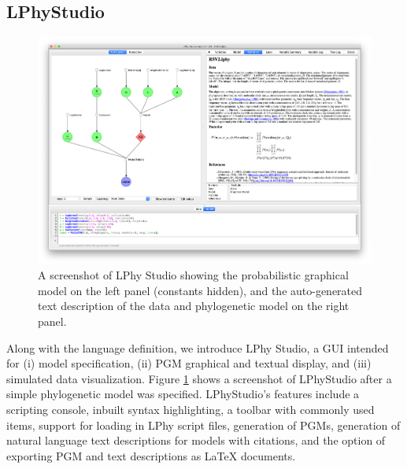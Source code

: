 \documentclass[10pt,letterpaper,table]{article}
\begin{document}

\subsection{LPhyStudio} 
\begin{figure}[!h]
  \includegraphics[width=\textwidth]{figs_plos/lphystudio_screenshot.png}
  \caption{A screenshot of LPhy Studio showing the probabilistic graphical model 
  on the left panel (constants hidden), and the auto-generated text description of the data and phylogenetic model on the right panel.} 
  \label{fig:lphystudio}
\end{figure}
Along with the language definition, we introduce LPhy Studio, a GUI intended for (i) model specification, (ii) PGM graphical and textual display, and (iii) simulated data visualization.
Figure \ref{fig:lphystudio} shows a screenshot of LPhyStudio after a simple phylogenetic model was specified. 
LPhyStudio's features include a scripting console, inbuilt syntax highlighting, a toolbar with commonly used items, support for loading in LPhy script files, generation of PGMs, generation of natural language text descriptions for models with citations, and the option of exporting PGM and text descriptions as LaTeX documents. 
\end{document}
